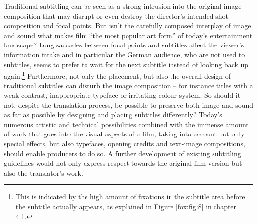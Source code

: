 \documentclass[output=paper]{langsci/langscibook}
\begin{document}
Traditional subtitling can be seen as a strong intrusion into the original image composition that may disrupt or even destroy the director’s intended shot composition and focal points. But isn’t the carefully composed interplay of image and sound what makes film “the most popular art form” \citep[p. 35]{mercado2010} of today’s entertainment landscape? Long saccades between focal points and subtitles affect the viewer’s information intake and in particular the German audience, who are not used to subtitles, seems to prefer to wait for the next subtitle instead of looking back up again.\footnote{This is indicated by the high amount of fixations in the subtitle area before the subtitle actually appears, as explained in Figure \ref{fox:fig:8} in chapter 4.1.} Furthermore, not only the placement, but also the overall design of traditional subtitles can disturb the image composition – for instance titles with a weak contrast, inappropriate typeface or irritating colour system. So should it not, despite the translation process, be possible to preserve both image and sound as far as possible by designing and placing subtitles differently? Today’s numerous artistic and technical possibilities combined with the immense amount of work that goes into the visual aspects of a film, taking into account not only special effects, but also typefaces, opening credits and text-image compositions, should enable producers to do so. A further development of existing subtitling guidelines would not only express respect towards the original film version but also the translator’s work.
\end{document}
